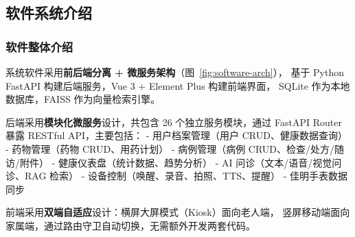 \documentclass[12pt, a4paper]{ctexart}
\begin{document}
\newpage

\subsection{软件系统介绍}

\subsubsection{软件整体介绍}

系统软件采用\textbf{前后端分离 + 微服务架构}（图~\ref{fig:software-arch}），
基于 Python FastAPI 构建后端服务，Vue 3 + Element Plus 构建前端界面，
SQLite 作为本地数据库，FAISS 作为向量检索引擎。

后端采用\textbf{模块化微服务}设计，共包含 26 个独立服务模块，通过 FastAPI Router
暴露 RESTful API，主要包括：
- 用户档案管理（用户 CRUD、健康数据查询）
- 药物管理（药物 CRUD、用药计划）
- 病例管理（病例 CRUD、检查/处方/随访/附件）
- 健康仪表盘（统计数据、趋势分析）
- AI 问诊（文本/语音/视觉问诊、RAG 检索）
- 设备控制（唤醒、录音、拍照、TTS、提醒）
- 佳明手表数据同步

前端采用\textbf{双端自适应}设计：横屏大屏模式（Kiosk）面向老人端，
竖屏移动端面向家属端，通过路由守卫自动切换，无需额外开发两套代码。
\end{document}

